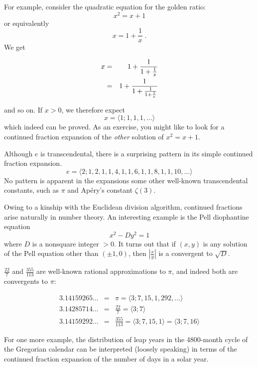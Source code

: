 \documentclass[12pt]{article}
\begin{document}
For example, consider the quadratic equation for the golden ratio: $$x^2 = x + 1$$ or equivalently $$x = 1 + \frac{1}{x}\;.$$ We get

\begin{eqnarray*}
x & = & 1 + \frac{1}{1+\frac{1}{x}} \\
  & = & 1 + \frac{1}{1+\frac{1}{1+\frac{1}{x}}}
\end{eqnarray*}

and so on.
If $x > 0$, we therefore expect $$x = \langle 1; 1, 1, 1, \ldots \rangle$$ which indeed can be proved. As an exercise, you might like to look for a continued fraction expansion of the \emph{other} solution of $x^2 = x + 1$.

Although $e$ is transcendental, there is a surprising pattern in its simple continued fraction expansion. 
$$e=\langle 2; 1, 2, 1, 1, 4, 1, 1, 6, 1, 1, 8, 1, 1, 10, \ldots \rangle$$
No pattern is apparent in the expansions some other well-known transcendental constants, such as $\pi$ and Ap\'ery's constant $\zeta(3)$.

Owing to a kinship with the Euclidean division algorithm, continued fractions arise naturally in number theory. An
interesting example is the Pell diophantine equation $$x^2 - Dy^2 = 1$$ where $D$ is a nonsquare integer $> 0$. It turns out that if $(x, y)$ is any solution of the Pell equation other than $(\pm 1, 0)$, then $| \frac{x}{y}|$ is a convergent to $\sqrt{D}$.

$\frac{22}{7}$ and $\frac{355}{113}$ are well-known rational approximations to $\pi$, and indeed both are convergents to $\pi$:

\begin{eqnarray*}
3.14159265\ldots & = & \pi = \langle 3;7,15,1,292,...\rangle \\
3.14285714\ldots & = & \frac{22}{7} = \langle 3;7\rangle \\
3.14159292\ldots & = & \frac{355}{113} = \langle 3;7,15,1\rangle=\langle 3;7,16\rangle
\end{eqnarray*}

For one more example, the distribution of leap years in the 4800-month cycle of the Gregorian calendar can be interpreted (loosely speaking) in terms of the continued fraction expansion of the number of days
in a solar year.
\end{document}
